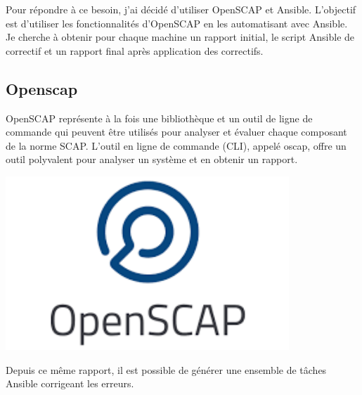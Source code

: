 \documentclass[12pt, a4paper, twoside]{article}
\begin{document}
Pour répondre à ce besoin, j'ai décidé d'utiliser \gls{OpenSCAP} et \gls{Ansible}. 
L'objectif est d'utiliser les fonctionnalités d'\gls{OpenSCAP} en les automatisant avec \gls{Ansible}.
Je cherche à obtenir pour chaque machine un rapport initial, le script \gls{Ansible} de correctif et un rapport final après application des correctifs. 

\subsection{Openscap}
\noindent%
\begin{minipage}{.7\textwidth}%
\gls{OpenSCAP} représente à la fois une bibliothèque et un outil de ligne de commande qui peuvent être utilisés pour analyser et évaluer chaque composant de la norme \gls{SCAP}. 
L'outil en ligne de commande (\gls{CLI}), appelé oscap, offre un outil polyvalent pour analyser un système et en obtenir un rapport. \cite{OpenSCAP} \\
\end{minipage}%
\hfill
\begin{minipage}{.3\textwidth}%
\begin{center}
\includegraphics[width=0.8\textwidth]{src/logo_openscap.png}
\end{center}
\end{minipage}%

Depuis ce même rapport, il est possible de générer une ensemble de tâches \gls{Ansible} corrigeant les erreurs.
\end{document}
